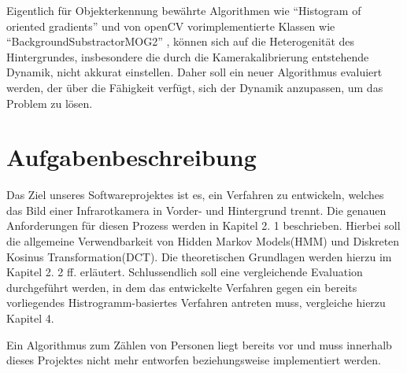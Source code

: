 Eigentlich für Objekterkennung bewährte Algorithmen wie “Histogram of oriented gradients” und von openCV vorimplementierte Klassen wie  “BackgroundSubstractorMOG2” , können sich auf die Heterogenität des Hintergrundes, insbesondere die durch die Kamerakalibrierung entstehende Dynamik, nicht akkurat einstellen.
 Daher soll ein neuer Algorithmus evaluiert werden, der über die Fähigkeit verfügt, sich der Dynamik anzupassen, um das Problem zu lösen.\\


\section{Aufgabenbeschreibung}

Das Ziel unseres Softwareprojektes ist es, ein Verfahren zu entwickeln, welches das Bild einer Infrarotkamera in Vorder- und Hintergrund trennt.
 Die genauen Anforderungen für diesen Prozess werden in Kapitel 2.
1 beschrieben.
 Hierbei soll die allgemeine Verwendbarkeit von Hidden Markov Models(HMM) und Diskreten Kosinus Transformation(DCT).
 Die theoretischen Grundlagen werden hierzu im Kapitel 2.
2 ff. erläutert.
 Schlussendlich soll eine vergleichende Evaluation durchgeführt werden, in dem das entwickelte Verfahren gegen ein bereits vorliegendes Histrogramm-basiertes Verfahren antreten muss, vergleiche hierzu Kapitel 4.

Ein Algorithmus zum Zählen von Personen liegt bereits vor und muss innerhalb dieses Projektes nicht mehr entworfen beziehungsweise implementiert werden.

